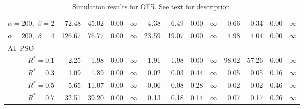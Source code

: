 \documentclass[12pt]{article}
\begin{document}
\begin{table}[ht]
{\begin{tabular}{r|rrrr|rrrr|rrrr}
  $\alpha = 200,$ $\beta =2$ & 72.48 & 45.02 & 0.00 & $\infty$ & 4.38 & 6.49 & 0.00 & $\infty$ & 0.66 & 0.34 & 0.00 & $\infty$ \\ 
  $\alpha = 200,$ $\beta =4$ & 126.67 & 76.77 & 0.00 & $\infty$ & 23.59 & 19.07 & 0.00 & $\infty$ & 4.98 & 4.04 & 0.00 & $\infty$ \\ 
\hline
\multicolumn{1}{l|}{AT-PSO} &&&&&&&&&&&&\\
  $R^* = 0.1$ & 2.25 & 1.98 & 0.00 & $\infty$ & 1.91 & 1.98 & 0.00 & $\infty$ & 98.02 & 57.26 & 0.00 & $\infty$ \\ 
  $R^* = 0.3$ & 1.09 & 1.89 & 0.00 & $\infty$ & 0.02 & 0.03 & 0.44 & $\infty$ & 0.05 & 0.05 & 0.16 & $\infty$ \\ 
  $R^* = 0.5$ & 5.65 & 11.07 & 0.00 & $\infty$ & 0.06 & 0.08 & 0.28 & $\infty$ & 0.02 & 0.02 & 0.46 & $\infty$ \\ 
  $R^* = 0.7$ & 32.51 & 39.20 & 0.00 & $\infty$ & 0.13 & 0.18 & 0.14 & $\infty$ & 0.07 & 0.17 & 0.26 & $\infty$ \\ 
   \hline
\end{tabular}
}
\caption{Simulation results for OF5. See text for description.}
\label{tab:psosim5}
\end{table}
\end{document}
